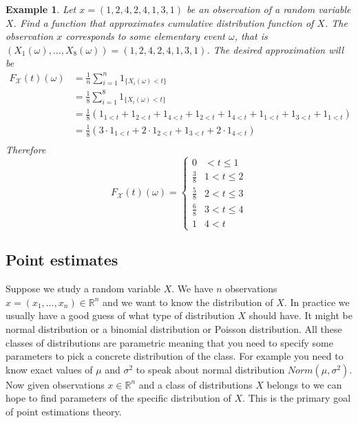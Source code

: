 \documentclass[12pt]{article}
\newtheorem{example}[theorem]{Example}
\begin{document}
\begin{example} Let $x=(1,2,4,2,4,1,3,1)$ be an observation of a random variable
    $X$. Find a function that approximates cumulative distribution function of
    $X$. The observation $x$ corresponds to some elementary event $\omega$, that
    is $(X_1(\omega),\ldots,X_{8}(\omega))=(1,2,4,2,4,1,3,1)$. The desired
    approximation will be
    \begin{align*}
        F_{\mathscr{X}}(t)(\omega)
         & =\frac{1}{n}\sum_{i=1}^{n} 1_{\{X_i(\omega)<t\}} \\
         & =\frac{1}{8}\sum_{i=1}^{8} 1_{\{X_i(\omega)<t\}} \\
         & =\frac{1}{8}\left(
        1_{1<t}+1_{2<t}+1_{4<t}+1_{2<t}+1_{4<t}+1_{1<t}+1_{3<t}+1_{1<t}
        \right)                                             \\
         & =\frac{1}{8}\left(
        3\cdot 1_{1<t}+2\cdot 1_{2<t}+1_{3<t}+2\cdot 1_{4<t}
        \right)                                             \\
    \end{align*}
    Therefore
    $$
        F_{\mathscr{X}}(t)(\omega)
        =\begin{cases}
            0           & < t \leq 1   \\
            \frac{3}{8} & 1 < t \leq 2 \\
            \frac{5}{8} & 2 < t \leq 3 \\
            \frac{6}{8} & 3 < t \leq 4 \\
            1           & 4 < t
        \end{cases}
    $$
\end{example}

\subsection{Point estimates}

Suppose we study a random variable $X$. We have $n$ observations
$x=(x_1,\ldots,x_n)\in\mathbb{R}^n$ and we want to know the distribution of $X$.
In practice we usually have a good guess of what type of distribution $X$ should
have. It might be normal distribution or a binomial distribution or Poisson
distribution. All these classes of distributions are parametric meaning that you
need to specify some parameters to pick a concrete distribution of the class.
For example you need to know exact values of $\mu$ and $\sigma^2$ to speak about
normal distribution $Norm(\mu,\sigma^2)$. Now given observations
$x\in\mathbb{R}^n$ and a class of distributions $X$ belongs to we can hope to
find parameters of the specific distribution of $X$. This is the primary goal of
point estimations theory.
\end{document}
